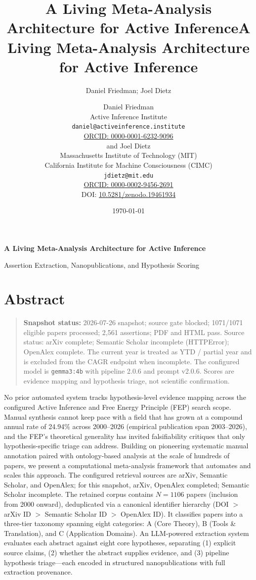\documentclass[
  english,
]{article}
\title{A Living Meta-Analysis Architecture for Active Inference}
\author{Daniel Friedman; Joel Dietz}
\date{}
\title{A Living Meta-Analysis Architecture for Active Inference}
\author{Daniel Friedman\\\footnotesize{Active Inference Institute}\\\footnotesize{\texttt{daniel@activeinference.institute}}\\\footnotesize{\href{https://orcid.org/0000-0001-6232-9096}{ORCID: 0000-0001-6232-9096}} \\and Joel Dietz\\\footnotesize{Massachusetts Institute of Technology (MIT)}\\\footnotesize{California Institute for Machine Consciousness (CIMC)}\\\footnotesize{\texttt{jdietz@mit.edu}}\\\footnotesize{\href{https://orcid.org/0000-0002-9456-2691}{ORCID: 0000-0002-9456-2691}} \\ \footnotesize{DOI: \href{https://doi.org/10.5281/zenodo.19461934}{10.5281/zenodo.19461934}}}
\date{\today}
\begin{document}
\begin{titlepage}
\centering
\vspace*{2cm}
{\LARGE\bfseries A Living Meta-Analysis Architecture for Active Inference\par}
\vspace{0.75em}
{\large Assertion Extraction, Nanopublications, and Hypothesis Scoring\par}
\vfill
\makeatletter
{\@author\par}
\vspace{1em}
{\@date\par}
\makeatother
\vfill
\end{titlepage}
\thispagestyle{empty}
\tableofcontents
\newpage

\section{Abstract}\label{abstract}

\begin{quote}
\textbf{Snapshot status:} 2026-07-26 snapshot; source gate blocked;
1071/1071 eligible papers processed; 2,561 assertions; PDF and HTML
pass. Source status: arXiv complete; Semantic Scholar incomplete
(HTTPError); OpenAlex complete. The current year is treated as YTD /
partial year and is excluded from the CAGR endpoint when incomplete. The
configured model is \texttt{gemma3:4b} with pipeline 2.0.6 and prompt
v2.0.6. Scores are evidence mapping and hypothesis triage, not
scientific confirmation.
\end{quote}

No prior automated system tracks hypothesis-level evidence mapping
across the configured Active Inference and Free Energy Principle (FEP)
search scope. Manual synthesis cannot keep pace with a field that has
grown at a compound annual rate of 24.94\% across 2000--2026 (empirical
publication span 2003--2026), and the FEP's theoretical generality has
invited falsifiability critiques that only hypothesis-specific triage
can address. Building on pioneering systematic manual annotation paired
with ontology-based analysis at the scale of hundreds of papers, we
present a computational meta-analysis framework that automates and
scales this approach. The configured retrieval sources are arXiv,
Semantic Scholar, and OpenAlex; for this snapshot, arXiv, OpenAlex
completed; Semantic Scholar incomplete. The retained corpus contains
\(N = 1106\) papers (inclusion from 2000 onward), deduplicated via a
canonical identifier hierarchy (DOI \(>\) arXiv ID \(>\) Semantic
Scholar ID \(>\) OpenAlex ID). It classifies papers into a three-tier
taxonomy spanning eight categories: A (Core Theory), B (Tools \&
Translation), and C (Application Domains). An LLM-powered extraction
system evaluates each abstract against eight core hypotheses, separating
(1) explicit source claims, (2) whether the abstract supplies evidence,
and (3) pipeline hypothesis triage---each encoded in structured
nanopublications with full extraction provenance.
\end{document}
